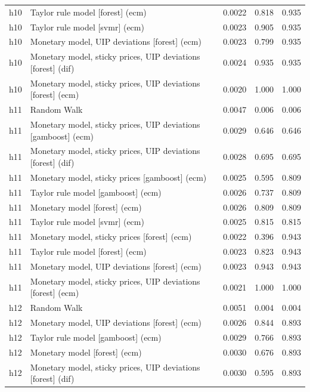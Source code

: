 \begin{ThreePartTable}
\begin{longtable}[t]{cp{5.5cm}ccc}
h10 & \raggedright Taylor rule model [forest] (ecm) & 0.0022 & 0.818 & 0.935\\
h10 & \raggedright Taylor rule model [svmr] (ecm) & 0.0023 & 0.905 & 0.935\\
h10 & \raggedright Monetary model, UIP deviations [forest] (ecm) & 0.0023 & 0.799 & 0.935\\
h10 & \raggedright Monetary model, sticky prices, UIP deviations [forest] (dif) & 0.0024 & 0.935 & 0.935\\
h10 & \raggedright Monetary model, sticky prices, UIP deviations [forest] (ecm) & 0.0020 & 1.000 & 1.000\\
\addlinespace
h11 & \raggedright Random Walk & 0.0047 & 0.006 & 0.006\\
h11 & \raggedright Monetary model, sticky prices, UIP deviations [gamboost] (ecm) & 0.0029 & 0.646 & 0.646\\
h11 & \raggedright Monetary model, sticky prices, UIP deviations [forest] (dif) & 0.0028 & 0.695 & 0.695\\
h11 & \raggedright Monetary model, sticky prices [gamboost] (ecm) & 0.0025 & 0.595 & 0.809\\
h11 & \raggedright Taylor rule model [gamboost] (ecm) & 0.0026 & 0.737 & 0.809\\
h11 & \raggedright Monetary model [forest] (ecm) & 0.0026 & 0.809 & 0.809\\
h11 & \raggedright Taylor rule model [svmr] (ecm) & 0.0025 & 0.815 & 0.815\\
h11 & \raggedright Monetary model, sticky prices [forest] (ecm) & 0.0022 & 0.396 & 0.943\\
h11 & \raggedright Taylor rule model [forest] (ecm) & 0.0023 & 0.823 & 0.943\\
h11 & \raggedright Monetary model, UIP deviations [forest] (ecm) & 0.0023 & 0.943 & 0.943\\
h11 & \raggedright Monetary model, sticky prices, UIP deviations [forest] (ecm) & 0.0021 & 1.000 & 1.000\\
\addlinespace
h12 & \raggedright Random Walk & 0.0051 & 0.004 & 0.004\\
h12 & \raggedright Monetary model, UIP deviations [forest] (ecm) & 0.0026 & 0.844 & 0.893\\
h12 & \raggedright Taylor rule model [gamboost] (ecm) & 0.0029 & 0.766 & 0.893\\
h12 & \raggedright Monetary model [forest] (ecm) & 0.0030 & 0.676 & 0.893\\
h12 & \raggedright Monetary model, sticky prices, UIP deviations [forest] (dif) & 0.0030 & 0.595 & 0.893\\

\end{longtable}
\end{ThreePartTable}
